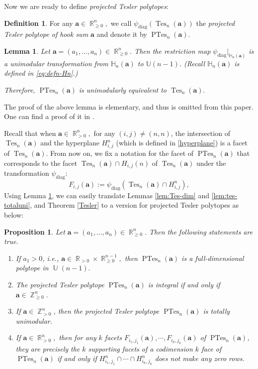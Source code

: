 \documentclass[12pt]{amsart}
\numberwithin{equation}{section}
\newtheorem{lem}[thm]{Lemma}
\newtheorem{prop}[thm]{Proposition}
\theoremstyle{definition}
\newtheorem{defn}[thm]{Definition}
\def\tes{\operatorname{Tes}}
\def\ptes{\operatorname{PTes}}
\def\diag{\operatorname{diag}}
\def\ba{{\boldsymbol{a}}}
\def\U{\operatorname{\mathbb{U}}}
\def\Z{\operatorname{\mathbb{Z}}}
\def\R{\operatorname{\mathbb{R}}}
\def\H{\mathbb{H}}
\begin{document}
Now we are ready to define \emph{projected Tesler polytopes}:
\begin{defn}\label{defn:psidiag}
  For any $\ba \in \R_{\ge 0}^n,$ we call $\psi_{\diag}(\tes_n(\ba))$ the \emph{projected Tesler polytope of hook sum $\ba$} and denote it by $\ptes_n(\ba)$.
\end{defn}

\begin{lem} \label{projmap}
  Let $\ba=(a_{1},\dots,a_{n}) \in \R_{\geq 0}^n$.
  Then the restriction map $\psi_{\diag}|_{\H_n(\ba)}$ is a unimodular transformation from $\H_n(\ba)$ to $\mathbb{U}(n-1)$. (Recall $\H_n(\ba)$ is defined in \eqref{eq:defn-Hn}.)

Therefore, $\ptes_n(\ba)$ is unimodularly equivalent to $\tes_n(\ba).$
\end{lem}

The proof of the above lemma is elementary, and thus is omitted from this paper. One can find a proof of it in \cite[Theorem 3.1.1]{thesis}.

Recall that when $\ba \in \R_{>0}^n,$ for any $(i,j) \neq (n,n)$, the intersection of $\tes_{n}(\ba)$ and the hyperplane $H_{i,j}^{n}$ (which is defined in \eqref{hyperplane}) is a facet of $\tes_n(\ba)$. From now on, we fix a notation for the facet of $\ptes_{n}(\ba)$ that corresponds to the facet $\tes_n(\ba) \cap H_{i,j}(n)$ of $\tes_n(\ba)$ under the transformation $\psi_{\diag}$:
\begin{equation} \label{facetdef}
  F_{i,j}(\ba):=\psi_{\diag}(\tes_{n}(\ba) \cap H_{i,j}^{n}),
\end{equation}
Using Lemma \ref{projmap}, we can easily translate Lemmas \ref{lem:Tes-dim} and \ref{lem:tes-totaluni}, and Theorem \ref{Tesler} to a version for projected Tesler polytopes as below:

\begin{prop}\label{prop:ptes}
  Let $\ba =(a_1, \dots, a_n) \in \R_{\ge 0}^n$. Then the following statements are true.
\begin{enumerate}
  \item \label{itm:pdim} 
    If $a_1 > 0$, i.e., $\ba \in \R_{>0} \times \R_{\ge 0}^{n-1},$ then $\ptes_n(\ba)$ is a full-dimensional polytope in $\U(n-1).$
  \item\label{itm:pint} The projected Tesler polytope $\ptes_n(\ba)$ is integral if and only if $\ba \in \Z_{\ge 0}^n.$
  \item\label{itm:ptot} If $\ba \in \Z_{> 0}^n$, then the projected Tesler polytope $\ptes_n(\ba)$ is totally unimodular. 

  \item\label{itm:pface} If $\ba \in \R_{>0}^n,$ then for any $k$ facets $F_{i_{1},j_{1}}(\ba), \cdots, F_{i_{k},j_{k}}(\ba)$ of $\ptes_n(\ba)$, they are precisely the $k$ supporting facets of a codimension $k$ face of $\ptes_n(\ba)$ if and only if $H_{i_{1},j_{1}}^{n} \cap \cdots \cap H_{i_{k},j_{k}}^{n}$ does not make any zero rows. 
\end{enumerate}
\end{prop}
\end{document}
